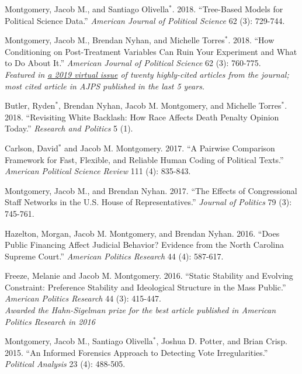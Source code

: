 \documentclass[10pt]{article}
\renewenvironment{CV}
  {\begin{list}{}
    {\renewcommand{\makelabel}{\entrylabel}
    \setlength{\labelwidth}{55pt}
    \setlength{\leftmargin}{62pt}
  }}
  {\end{list}}
\newcommand{\cvnote}[1]{\\[0.1em]{\hspace*{0.5em}\small\itshape #1}}
\newcommand{\student}[1]{#1$^{*}$}
\begin{document}
\begin{CV}
\item[] Montgomery, Jacob M., and \student{Santiago Olivella}.  2018. ``Tree-Based Models for Political Science Data.'' \textit{American Journal of Political Science} 62 (3): 729-744.

\item[] Montgomery, Jacob M., Brendan Nyhan, and
  \student{Michelle Torres}.  2018. ``How Conditioning on Post-Treatment Variables
  Can Ruin Your Experiment and What to Do About It.''  
  \textit{American Journal of Political Science} 62 (3): 760-775.\cvnote{Featured in
\href{https://onlinelibrary.wiley.com/page/journal/15405907/homepage/vimostrecent}{a
  2019 virtual issue} of twenty highly-cited articles from the
journal;  most cited article in AJPS published in the
last 5 years.}

\item[] \student{Butler, Ryden}, Brendan Nyhan, Jacob
  M. Montgomery, and \student{Michelle Torres}. 2018. ``Revisiting White
  Backlash: How Race Affects Death Penalty Opinion Today.''
  \textit{Research and Politics} 5 (1).
  

\item[] \student{Carlson, David} and Jacob
  M. Montgomery. 2017. ``A Pairwise Comparison Framework for Fast, Flexible, and
Reliable Human Coding of Political Texts.'' \textit{American Political
  Science Review} 111 (4): 835-843.

\item[] Montgomery, Jacob M., and Brendan
  Nyhan. 2017. ``The
    Effects of Congressional Staff Networks in the U.S. House of
    Representatives.'' \textit{Journal of Politics} 79 (3): 745-761.

\item[] Hazelton, Morgan, Jacob M. Montgomery, and Brendan Nyhan. 2016.  ``Does Public Financing Affect Judicial Behavior? Evidence from the North Carolina Supreme Court.''  \textit{American Politics Research} 44 (4): 587-617.



\item[] Freeze, Melanie and Jacob M. Montgomery. 2016. ``Static Stability and Evolving Constraint: Preference Stability and Ideological Structure in the Mass Public.''  \textit{American Politics Research} 44 (3): 415-447.\cvnote{Awarded the Hahn-Sigelman prize for the best article published in
\textit{American Politics Research} in 2016}

\item[] Montgomery, Jacob M., \student{Santiago Olivella}, Joshua D. Potter, and
  Brian Crisp. 2015. ``An
    Informed Forensics Approach to Detecting Vote Irregularities.''
  \textit{Political Analysis} 23 (4): 488-505.





\end{CV}
\end{document}
